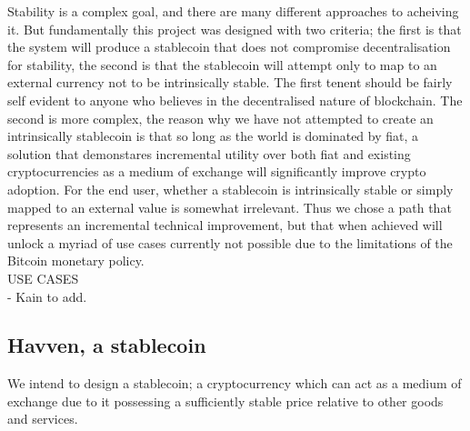 \documentclass{article}
\begin{document}
\noindent Stability is a complex goal, and there are many different approaches to acheiving it. But fundamentally this project was designed with two criteria; the first is that the system will produce a stablecoin that does not compromise decentralisation for stability, the second is that the stablecoin will attempt only to map to an external currency not to be intrinsically stable. The first tenent should be fairly self evident to anyone who believes in the decentralised nature of blockchain. The second is more complex, the reason why we have not attempted to create an intrinsically stablecoin is that so long as the world is dominated by fiat, a solution that demonstares incremental utility over both fiat and existing cryptocurrencies as a medium of exchange will significantly improve crypto adoption. For the end user, whether a stablecoin is intrinsically stable or simply mapped to an external value is somewhat irrelevant. Thus we chose a path that represents an incremental technical improvement, but that when achieved will unlock a myriad of use cases currently not possible due to the limitations of the Bitcoin monetary policy. \\

\noindent USE CASES \\

- Kain to add.

\subsection{Havven, a stablecoin}

\noindent We intend to design a stablecoin; a cryptocurrency which can act as a medium of exchange due to it possessing a sufficiently stable price relative to other goods and services. \\
\end{document}
